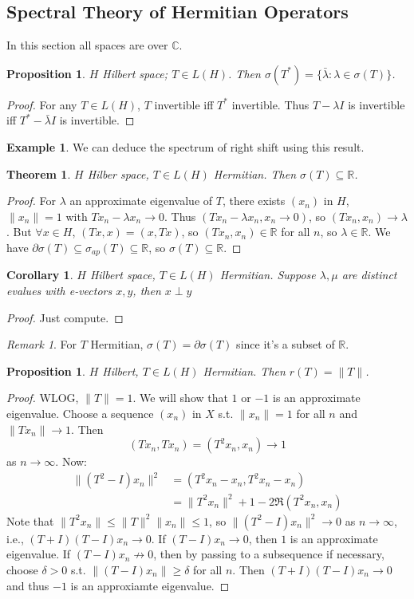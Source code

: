 \documentclass{article}
\theoremstyle{definition}
\newtheorem{example}[defn]{Example}
\theoremstyle{remark}
\newtheorem{rem}{Remark}
\theoremstyle{plain}
\newtheorem{thm}[defn]{Theorem}
\newtheorem{prop}[defn]{Proposition}
\newtheorem{crly}[defn]{Corollary}
\newcommand{\RR}{\mathbb{R}}
\newcommand{\CC}{\mathbb{C}}
\begin{document}
\subsection{Spectral Theory of Hermitian Operators}
In this section all spaces are over $\CC$.
\begin{prop}
    $H$ Hilbert space; $T\in L(H)$. Then $\sigma(T^\ast)=\{\bar\lambda:\lambda\in\sigma(T)\}$.
\end{prop}
\begin{proof}
    For any $T\in L(H)$, $T$ invertible iff $T^\ast $ invertible. Thus $T-\lambda I$ is invertible iff $T^\ast-\bar\lambda I$ is invertible.
\end{proof}
\begin{example}
    We can deduce the spectrum of right shift using this result.
\end{example}
\begin{thm}
    $H$ Hilber space, $T\in L(H)$ Hermitian. Then $\sigma(T)\subseteq \RR$.
\end{thm}
\begin{proof}
    For $\lambda$ an approximate eigenvalue of $T$, there exists $(x_n)$ in $H$, $\|x_n\|=1$ with $Tx_n-\lambda x_n\to 0$. Thus $(Tx_n-\lambda x_n,x_n\to 0)$, so $(Tx_n,x_n)\to \lambda$. But $\forall x\in H$, $(Tx,x)=(x,Tx)$, so $(Tx_n,x_n)\in \RR$ for all $n$, so $\lambda\in \RR$. We have $\partial\sigma(T)\subseteq\sigma_{ap}(T)\subseteq \RR$, so $\sigma(T)\subseteq \RR$.
\end{proof}
\begin{crly}
    $H$ Hilbert space, $T\in L(H)$ Hermitian. Suppose $\lambda,\mu$ are distinct evalues with e-vectors $x,y$, then $x\perp y$
\end{crly}
\begin{proof}
    Just compute.
\end{proof}
\begin{rem}
    For $T$ Hermitian, $\sigma(T)=\partial\sigma(T)$ since it's a subset of $\RR$.
\end{rem}
\begin{prop}
    $H$ Hilbert, $T\in L(H)$ Hermitian. Then $r(T)=\|T\|$.
\end{prop}
\begin{proof}
    WLOG, $\|T\|=1$. We will show that $1$ or $-1$ is an approximate eigenvalue. Choose a sequence $(x_n)$ in $X$ s.t. $\|x_n\|=1$ for all $n$ and $\|Tx_n\|\to 1$. Then
    \[(Tx_n,Tx_n)=(T^2x_n,x_n)\to 1\] as $n\to\infty$.
    Now:
    \begin{align*}\|(T^2-I)x_n\|^2&=(T^2x_n-x_n,T^2x_n-x_n)\\
    &=\|T^2x_n\|^2+1-2\Re(T^2x_n,x_n)
    \end{align*}
    Note that $\|T^2x_n\|\le \|T\|^2\|x_n\|\le 1$, so $\|(T^2-I)x_n\|^2\to 0$ as $n\to \infty$, i.e., $(T+I)(T-I)x_n\to 0$. If $(T-I)x_n\to 0$, then $1$ is an approximate eigenvalue. If $(T-I)x_n\not\to 0$, then by passing to a subsequence if necessary, choose $\delta>0$ s.t. $\|(T-I)x_n\|\ge \delta$ for all $n$. Then $(T+I)(T-I)x_n\to 0$ and thus $-1$ is an approxiamte eigenvalue.
\end{proof}
\end{document}
